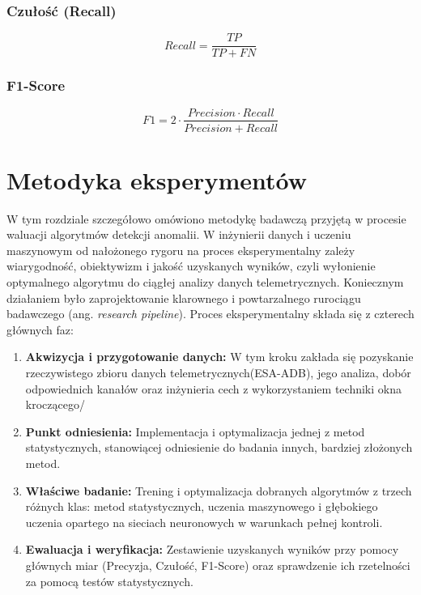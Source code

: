 \documentclass[a4paper,twoside,12pt]{book}
\newcommand{\ksremark}[1]{%
	{%
		{\color{brickred}{[#1]}}}%
	\addcontentsline{rks}{uwagas}{\protect{#1}}%
}
\newcommand{\obcy}[1]{\emph{#1}}
\newcommand{\english}[1]{{\selectlanguage{british}\obcy{#1}}}
\begin{document}
	\subsection{Czułość (Recall)}
	
	
	\begin{equation}
		Recall = \frac{TP}{TP + FN}
		\label{eq:recall}
	\end{equation} 
	\cite{sathyanarayanan2024confusion}
	
	\subsection{F1-Score}
	
	\ksremark{$F_1$}
	\begin{equation}
		F1 = 2 \cdot \frac{Precision \cdot Recall}{Precision + Recall}
		\label{eq:f1score}
	\end{equation}
	
	\cite{sathyanarayanan2024confusion}
	
	
	\chapter{Metodyka eksperymentów} 
	
	W tym rozdziale szczegółowo omówiono metodykę badawczą przyjętą w procesie waluacji algorytmów detekcji anomalii. W inżynierii danych i uczeniu maszynowym od nałożonego rygoru na proces eksperymentalny zależy wiarygodność, obiektywizm i jakość uzyskanych wyników, czyli wyłonienie optymalnego algorytmu do ciągłej analizy danych telemetrycznych. Koniecznym działaniem było zaprojektowanie klarownego i powtarzalnego rurociągu badawczego (ang. \english{research pipeline}).
	Proces eksperymentalny składa się z czterech głównych faz:
	\begin{enumerate}
		\item \textbf{Akwizycja i przygotowanie danych:} W tym kroku zakłada się pozyskanie rzeczywistego zbioru danych telemetrycznych(ESA-ADB), jego analiza, dobór odpowiednich kanałów oraz inżynieria cech z wykorzystaniem techniki okna kroczącego/
		\item \textbf {Punkt odniesienia:} Implementacja i optymalizacja jednej z metod statystycznych, stanowiącej odniesienie do badania innych, bardziej złożonych metod.
		\item \textbf{Właściwe badanie:} Trening i optymalizacja dobranych algorytmów z trzech różnych klas: metod statystycznych, uczenia maszynowego i głębokiego uczenia opartego na sieciach neuronowych w warunkach pełnej kontroli.
		\item \textbf {Ewaluacja i weryfikacja:} Zestawienie uzyskanych wyników przy pomocy głównych miar (Precyzja, Czułość, F1-Score) oraz sprawdzenie ich rzetelności za pomocą testów statystycznych.
	\end{enumerate}
	
\end{document}
